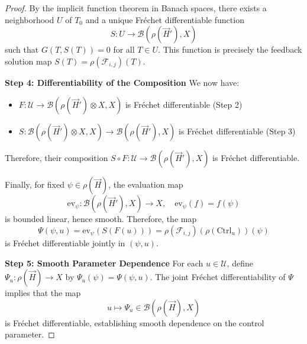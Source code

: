 \documentclass[10pt,a4paper]{amsart}
\begin{document}
\begin{proof}
By the implicit function theorem in Banach spaces, there exists a neighborhood \(U\) of \(T_0\) and a unique Fr\'echet differentiable function
\[
S: U \to \mathcal{B}(\rho(\vec{H}'), X)
\]
such that \(G(T, S(T)) = 0\) for all \(T \in U\). This function is precisely the feedback solution map \(S(T) = \rho(\mathcal{F}_{i,j})(T)\).

\medskip
\noindent\textbf{Step 4: Differentiability of the Composition}
We now have:
\begin{itemize}
    \item \(F: \mathcal{U} \to \mathcal{B}(\rho(\vec{H}') \otimes X, X)\) is Fr\'echet differentiable (Step 2)
    \item \(S: \mathcal{B}(\rho(\vec{H}') \otimes X, X) \to \mathcal{B}(\rho(\vec{H}'), X)\) is Fr\'echet differentiable (Step 3)
\end{itemize}
Therefore, their composition \(S \circ F: \mathcal{U} \to \mathcal{B}(\rho(\vec{H}'), X)\) is Fr\'echet differentiable.

Finally, for fixed \(\psi \in \rho(\vec{H})\), the evaluation map
\[
\mathrm{ev}_\psi: \mathcal{B}(\rho(\vec{H}'), X) \to X, \quad \mathrm{ev}_\psi(f) = f(\psi)
\]
is bounded linear, hence smooth. Therefore, the map
\[
\Psi(\psi, u) = \mathrm{ev}_\psi(S(F(u))) = \rho(\mathcal{F}_{i,j})(\rho(\mathrm{Ctrl}_u))(\psi)
\]
is Fr\'echet differentiable jointly in \((\psi, u)\).

\medskip
\noindent\textbf{Step 5: Smooth Parameter Dependence}
For each \(u \in \mathcal{U}\), define \(\Psi_u: \rho(\vec{H}) \to X\) by \(\Psi_u(\psi) = \Psi(\psi, u)\). The joint Fr\'echet differentiability of \(\Psi\) implies that the map
\[
u \mapsto \Psi_u \in \mathcal{B}(\rho(\vec{H}), X)
\]
is Fr\'echet differentiable, establishing smooth dependence on the control parameter.
\end{proof}
\end{document}
